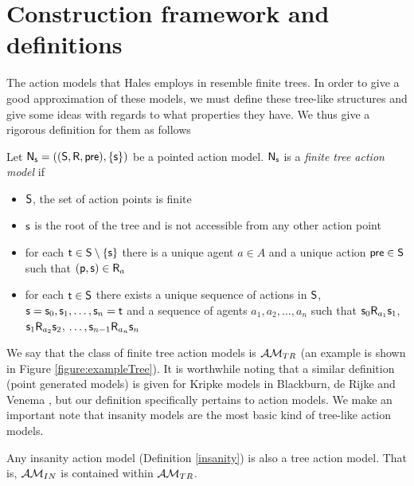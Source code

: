 \section{Construction framework and definitions} \label{subsec:Multi:techPrelim}

The action models that Hales employs in \cite{hales13synthesis} resemble finite trees.
In order to give a good approximation of these models, we must define these tree-like structures and
give some ideas with regards to what properties they have.
We thus give a rigorous definition for them as follows

\begin{defn} \label{finTree}
Let $\mathrm{\mathsf{N}}_\mathrm{\mathsf{s}} = ((\mathrm{\mathsf{S}}, \mathrm{\mathsf{R}}, \mathrm{\mathsf{pre}}), \{\mathrm{\mathsf{s}}\})$ be a pointed action model.
$\mathrm{\mathsf{N}}_\mathrm{\mathsf{s}}$ is a {\em finite tree action model} if
\begin{itemize}
	\item $\mathrm{\mathsf{S}}$, the set of action points is finite
	\item $\mathrm{\mathsf{s}}$ is the root of the tree and is not accessible from any other action point
	\item for each $\mathrm{\mathsf{t}} \in \mathrm{\mathsf{S}} \setminus \{ \mathrm{\mathsf{s}} \}$ there is a unique agent $a \in A$ and a unique
	action $\mathrm{\mathsf{pre}} \in \mathrm{\mathsf{S}}$ such that $\mathrm{\mathsf{(p,s)}} \in \mathrm{\mathsf{R}}_a$
	\item for each $\mathrm{\mathsf{t}} \in \mathrm{\mathsf{S}}$ there exists a unique sequence of actions in $\mathrm{\mathsf{S}}$, $\mathrm{\mathsf{s}} = \mathrm{\mathsf{s}}_0,
	\mathrm{\mathsf{s}}_1, \ldots, \mathrm{\mathsf{s}}_n = \mathrm{\mathsf{t}}$ and a sequence of agents $a_1, a_2, \ldots, a_n$ such that $\mathrm{\mathsf{s}}_0
	\mathrm{\mathsf{R}}_{a_1}
	\mathrm{\mathsf{s}}_1$, $\mathrm{\mathsf{s}}_1 \mathrm{\mathsf{R}}_{a_2} \mathrm{\mathsf{s}}_2$, $\ldots, \mathrm{\mathsf{s}}_{n-1} \mathrm{\mathsf{R}}_{a_n} \mathrm{\mathsf{s}}_n$
\end{itemize}
\end{defn}

We say that the class of finite tree action models is $\mathcal{AM}_{TR}$ (an example is shown in Figure
\ref{figure:exampleTree}).
It is worthwhile noting that a similar definition (point generated models) is given for Kripke models in Blackburn, de Rijke
and Venema \cite{blackburn2002modal}, but our definition specifically pertains to action models.
We make an important note that insanity models are the most basic kind of tree-like action models.

\begin{lemma} \label{insaneIsTree}
	Any insanity action model (Definition \ref{insanity}) is also a tree action model.
	That is, $\mathcal{AM}_{IN}$ is contained within $\mathcal{AM}_{TR}$.
\end{lemma}

